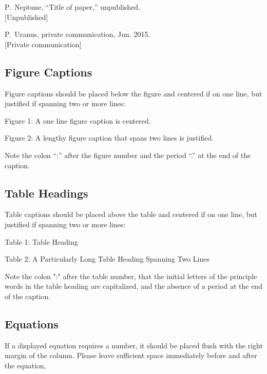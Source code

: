 \documentclass[letterpaper,  %
              ]{jacow-2_3}   %
\begin{document}
\begin{thebibliography}{99} %
	\setcounter{enumi}{18}
		P.~Neptune, “Title of paper,” unpublished.\\
	\textcolor{junpu}{[Unpublished]}
	
	P.~Uranus, private communication, Jun. 2015.\\
	\textcolor{junpu}{[Private communication]}

\end{thebibliography}
\null  %

\subsection{Figure Captions}

Figure captions should be placed below the figure and
centered if on one line, but justified if spanning two or
more lines:
\begin{center}
	Figure 1: A one line figure caption is centered.
\end{center}
\begin{justify}
	Figure 2: A lengthy figure caption that spans 
	two lines is justified.
\end{justify}
Note the colon “:” after the figure number and the period
“.” at the end of the caption.

\subsection{Table Headings}

Table captions should be placed above the table and
centered if on one line, but justified if spanning two or
more lines:
\begin{center}
	Table 1: Table Heading
\end{center}
\begin{justify}
	Table 2: A Particularly Long Table Heading 
	Spanning Two Lines
\end{justify}

Note the colon ":" after the table number, that the initial
letters of the principle words in the table heading are
capitalized, and the absence of a period at the end of the
caption.


\subsection{Equations}

If a displayed equation requires a number, it should be
placed flush with the right margin of the column. Please
leave sufficient space immediately before and after the
equation,
\end{document}
